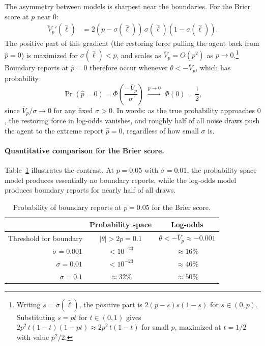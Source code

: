 \documentclass[11pt]{article}
\begin{document}
The asymmetry between models is sharpest near the boundaries. For the Brier score at $p$ near $0$:
\begin{align}
\tilde{V}_p'(\hat{\ell}) &= 2(p - \sigma(\hat{\ell}))\,\sigma(\hat{\ell})(1 - \sigma(\hat{\ell})).
\end{align}
The positive part of this gradient (the restoring force pulling the agent back from $\hat{p} = 0$) is maximized for $\sigma(\hat{\ell}) < p$, and scales as $\overline{V}_p = O(p^2)$ as $p \to 0$.\footnote{Writing $s = \sigma(\hat{\ell})$, the positive part is $2(p-s)s(1-s)$ for $s \in (0,p)$. Substituting $s = pt$ for $t \in (0,1)$ gives $2p^2\,t(1-t)(1-pt) \approx 2p^2\,t(1-t)$ for small $p$, maximized at $t = 1/2$ with value $p^2/2$.} Boundary reports at $\hat{p} = 0$ therefore occur whenever $\theta < -\overline{V}_p$, which has probability
\[
\Pr(\hat{p} = 0) = \Phi\!\left(\frac{-\overline{V}_p}{\sigma}\right) \;\xrightarrow{p \to 0}\; \Phi(0) = \frac{1}{2},
\]
since $\overline{V}_p / \sigma \to 0$ for any fixed $\sigma > 0$. In words: as the true probability approaches $0$, the restoring force in log-odds vanishes, and roughly half of all noise draws push the agent to the extreme report $\hat{p} = 0$, regardless of how small $\sigma$ is.

\paragraph{Quantitative comparison for the Brier score.} Table~\ref{tab:model-comparison} illustrates the contrast. At $p = 0.05$ with $\sigma = 0.01$, the probability-space model produces essentially no boundary reports, while the log-odds model produces boundary reports for nearly half of all draws.

\begin{table}[h]
\centering
\caption{Probability of boundary reports at $p = 0.05$ for the Brier score.}
\label{tab:model-comparison}
\begin{tabular}{r|cc}
& Probability space & Log-odds \\
\hline
Threshold for boundary & $|\theta| > 2p = 0.1$ & $\theta < -\overline{V}_p \approx -0.001$ \\[4pt]
$\sigma = 0.001$ & $< 10^{-23}$ & $\approx 16\%$ \\
$\sigma = 0.01$ & $< 10^{-23}$ & $\approx 46\%$ \\
$\sigma = 0.1$ & $\approx 32\%$ & $\approx 50\%$ \\
\end{tabular}
\end{table}
\end{document}
